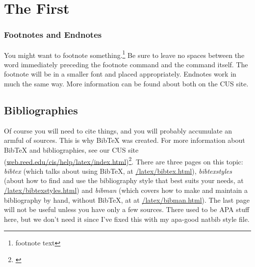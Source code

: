 \documentclass[12pt,twoside]{reedthesis}
\renewcommand{\'}{^{'}}
\begin{document}
	
\chapter{The First}





\subsection{Footnotes and Endnotes}
	You might want to footnote something.\footnote{footnote text} Be sure to leave no spaces between the word immediately preceding the footnote command and the command itself. The footnote will be in a smaller font and placed appropriately. Endnotes work in much the same way. More information can be found about both on the CUS site.
	
\section{Bibliographies}
	Of course you will need to cite things, and you will probably accumulate an armful of sources. This is why BibTeX was created. For more information about BibTeX and bibliographies, see our CUS site (\url{web.reed.edu/cis/help/latex/index.html})\footnote{\cite{reedweb:2007}}. There are three pages on this topic: {\it bibtex} (which talks about using BibTeX, at \url{/latex/bibtex.html}), {\it bibtexstyles} (about how to find and use the bibliography style that best suits your needs, at \url{/latex/bibtexstyles.html}) and {\it bibman} (which covers how to make and maintain a bibliography by hand, without BibTeX, at at \url{/latex/bibman.html}). The last page will not be useful unless you have only a few sources. There used to be APA stuff here, but we don't need it since I've fixed this with my apa-good natbib style file.
	
\end{document}
